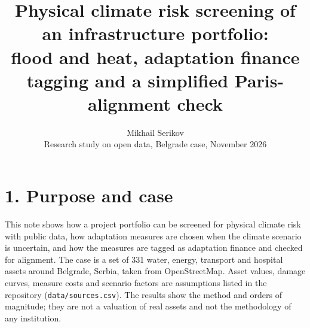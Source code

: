 \documentclass[11pt,a4paper]{article}
\title{\vspace{-1.2cm}Physical climate risk screening of an infrastructure portfolio:\\ flood and heat, adaptation finance tagging and a simplified Paris-alignment check\vspace{-0.3cm}}
\author{Mikhail Serikov \\ \small Research study on open data, Belgrade case, November 2026}
\date{}
\begin{document}
\maketitle

\section*{1. Purpose and case}
This note shows how a project portfolio can be screened for physical climate risk with public data, how adaptation measures are chosen when the climate scenario is uncertain, and how the measures are tagged as adaptation finance and checked for alignment. The case is a set of 331 water, energy, transport and hospital assets around Belgrade, Serbia, taken from OpenStreetMap. Asset values, damage curves, measure costs and scenario factors are assumptions listed in the repository (\texttt{data/sources.csv}). The results show the method and orders of magnitude; they are not a valuation of real assets and not the methodology of any institution.
\end{document}
